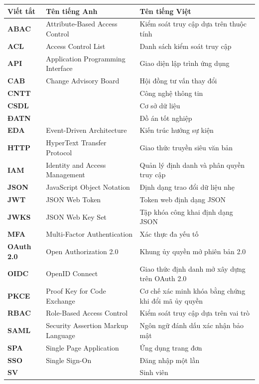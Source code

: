 \documentclass[../DoAn.tex]{subfiles}
\begin{document}
\begin{longtable}{l p{6cm} p{7cm}}
	\hline
	\textbf{Viết tắt} & \textbf{Tên tiếng Anh} & \textbf{Tên tiếng Việt} \\ \hline
	\endhead
	\textbf{ABAC}     & Attribute-Based Access Control   & Kiểm soát truy cập dựa trên thuộc tính \\
	\textbf{ACL}      & Access Control List               & Danh sách kiểm soát truy cập \\
	\textbf{API}      & Application Programming Interface & Giao diện lập trình ứng dụng \\
	\textbf{CAB}      & Change Advisory Board            & Hội đồng tư vấn thay đổi \\
	\textbf{CNTT}     &                                  & Công nghệ thông tin \\
	\textbf{CSDL}     &                                  & Cơ sở dữ liệu \\
	\textbf{ĐATN}     &                                  & Đồ án tốt nghiệp \\
	\textbf{EDA}      & Event-Driven Architecture        & Kiến trúc hướng sự kiện \\
	\textbf{HTTP}     & HyperText Transfer Protocol      & Giao thức truyền siêu văn bản \\
	\textbf{IAM}      & Identity and Access Management   & Quản lý định danh và phân quyền truy cập \\
	\textbf{JSON}     & JavaScript Object Notation       & Định dạng trao đổi dữ liệu nhẹ \\
	\textbf{JWT}      & JSON Web Token                   & Token web định dạng JSON \\
	\textbf{JWKS}     & JSON Web Key Set                 & Tập khóa công khai định dạng JSON \\
	\textbf{MFA}      & Multi-Factor Authentication      & Xác thực đa yếu tố \\
	\textbf{OAuth 2.0} & Open Authorization 2.0          & Khung ủy quyền mở phiên bản 2.0 \\
	\textbf{OIDC}     & OpenID Connect                   & Giao thức định danh mở xây dựng trên OAuth 2.0 \\
	\textbf{PKCE}     & Proof Key for Code Exchange      & Cơ chế xác minh khóa bằng chứng khi đổi mã ủy quyền \\
	\textbf{RBAC}     & Role-Based Access Control        & Kiểm soát truy cập dựa trên vai trò \\
	\textbf{SAML}     & Security Assertion Markup Language & Ngôn ngữ đánh dấu xác nhận bảo mật \\
	\textbf{SPA}      & Single Page Application          & Ứng dụng trang đơn \\
	\textbf{SSO}      & Single Sign-On                   & Đăng nhập một lần \\
	\textbf{SV}       &                                  & Sinh viên \\
	\hline
\end{longtable}
\end{document}
